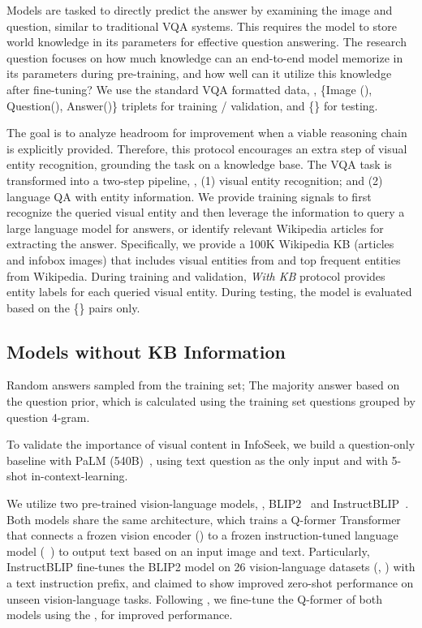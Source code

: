 \documentclass[11pt]{article}
\begin{document}
 Models are tasked to directly predict the answer by examining the image and question, similar to traditional VQA systems. 
This requires the model to store world knowledge in its parameters for effective question answering. The research question focuses on how much knowledge can an end-to-end model memorize in its parameters during pre-training, and how well can it utilize this knowledge after fine-tuning? 
We use the standard VQA formatted data, \ie, \{Image (), Question(), Answer()\} triplets for training / validation, and \{\} for testing. 


 The goal is to analyze headroom for improvement when a viable reasoning chain is explicitly provided.
Therefore, this protocol encourages an extra step of visual entity recognition, grounding the task on a knowledge base.
The VQA task is transformed into a two-step pipeline, \ie, (1) visual entity recognition; and (2) language QA with entity information. 
We provide training signals to first recognize the queried visual entity and then leverage the information to query a large language model for answers, or identify relevant Wikipedia articles for extracting the answer. 
Specifically, we provide a 100K Wikipedia KB (articles and infobox images) that includes visual entities from \ourdataset and top frequent entities from Wikipedia.
During training and validation, \emph{With KB} protocol provides entity labels for each queried visual entity. 
During testing, the model is evaluated based on the \{\} pairs only.

\subsection{Models without KB Information}
\label{subsec:e2e_models}
 Random answers sampled from the training set; The majority answer based on the question prior, which is calculated using the training set questions grouped by question 4-gram.

To validate the importance of visual content in {\sc InfoSeek}, we build a question-only baseline with PaLM (540B)~\citep{chowdhery2022palm}, using text question as the only input and with 5-shot in-context-learning.

We utilize two pre-trained vision-language models, \ie, BLIP2~\citep{li2023blip} and InstructBLIP~\citep{dai2023instructblip}.
Both models share the same architecture, which trains a Q-former Transformer that connects a frozen vision encoder () to a frozen instruction-tuned language model (~\cite{chung2022scaling}) to output text based on an input image and text. Particularly, InstructBLIP fine-tunes the BLIP2 model on 26 vision-language datasets (\eg, ) with a text instruction prefix, and claimed to show improved zero-shot performance on unseen vision-language tasks.
Following \citet{li2023blip}, we fine-tune the Q-former of both models using the \infoseek, for improved performance.
\end{document}
